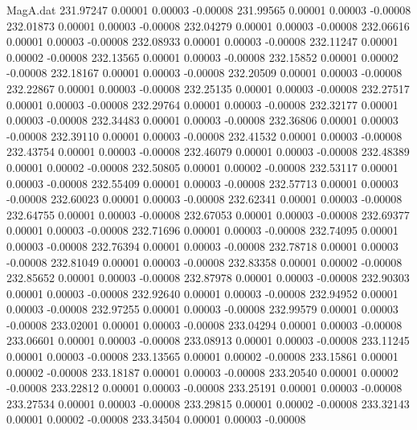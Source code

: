 \begin{filecontents}{MagA.dat}
 231.97247    0.00001    0.00003   -0.00008
 231.99565    0.00001    0.00003   -0.00008
 232.01873    0.00001    0.00003   -0.00008
 232.04279    0.00001    0.00003   -0.00008
 232.06616    0.00001    0.00003   -0.00008
 232.08933    0.00001    0.00003   -0.00008
 232.11247    0.00001    0.00002   -0.00008
 232.13565    0.00001    0.00003   -0.00008
 232.15852    0.00001    0.00002   -0.00008
 232.18167    0.00001    0.00003   -0.00008
 232.20509    0.00001    0.00003   -0.00008
 232.22867    0.00001    0.00003   -0.00008
 232.25135    0.00001    0.00003   -0.00008
 232.27517    0.00001    0.00003   -0.00008
 232.29764    0.00001    0.00003   -0.00008
 232.32177    0.00001    0.00003   -0.00008
 232.34483    0.00001    0.00003   -0.00008
 232.36806    0.00001    0.00003   -0.00008
 232.39110    0.00001    0.00003   -0.00008
 232.41532    0.00001    0.00003   -0.00008
 232.43754    0.00001    0.00003   -0.00008
 232.46079    0.00001    0.00003   -0.00008
 232.48389    0.00001    0.00002   -0.00008
 232.50805    0.00001    0.00002   -0.00008
 232.53117    0.00001    0.00003   -0.00008
 232.55409    0.00001    0.00003   -0.00008
 232.57713    0.00001    0.00003   -0.00008
 232.60023    0.00001    0.00003   -0.00008
 232.62341    0.00001    0.00003   -0.00008
 232.64755    0.00001    0.00003   -0.00008
 232.67053    0.00001    0.00003   -0.00008
 232.69377    0.00001    0.00003   -0.00008
 232.71696    0.00001    0.00003   -0.00008
 232.74095    0.00001    0.00003   -0.00008
 232.76394    0.00001    0.00003   -0.00008
 232.78718    0.00001    0.00003   -0.00008
 232.81049    0.00001    0.00003   -0.00008
 232.83358    0.00001    0.00002   -0.00008
 232.85652    0.00001    0.00003   -0.00008
 232.87978    0.00001    0.00003   -0.00008
 232.90303    0.00001    0.00003   -0.00008
 232.92640    0.00001    0.00003   -0.00008
 232.94952    0.00001    0.00003   -0.00008
 232.97255    0.00001    0.00003   -0.00008
 232.99579    0.00001    0.00003   -0.00008
 233.02001    0.00001    0.00003   -0.00008
 233.04294    0.00001    0.00003   -0.00008
 233.06601    0.00001    0.00003   -0.00008
 233.08913    0.00001    0.00003   -0.00008
 233.11245    0.00001    0.00003   -0.00008
 233.13565    0.00001    0.00002   -0.00008
 233.15861    0.00001    0.00002   -0.00008
 233.18187    0.00001    0.00003   -0.00008
 233.20540    0.00001    0.00002   -0.00008
 233.22812    0.00001    0.00003   -0.00008
 233.25191    0.00001    0.00003   -0.00008
 233.27534    0.00001    0.00003   -0.00008
 233.29815    0.00001    0.00002   -0.00008
 233.32143    0.00001    0.00002   -0.00008
 233.34504    0.00001    0.00003   -0.00008

\end{filecontents}
